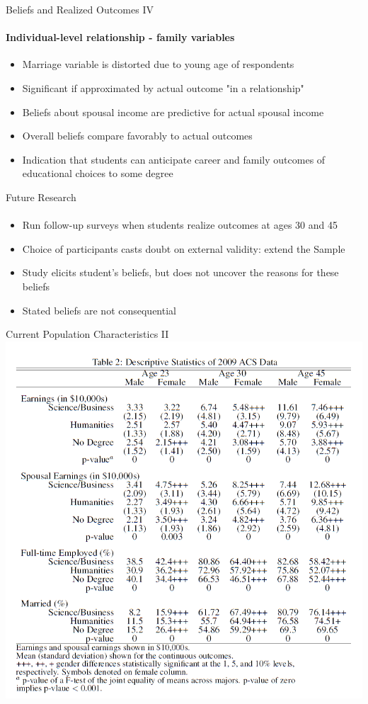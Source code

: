 \documentclass[12pt]{beamer}
\begin{document}
\begin{frame}{Beliefs and Realized Outcomes IV}
    \framesubtitle{Individual-level relationship - family variables}
    \begin{itemize}
        \item Marriage variable is distorted due to young age of respondents
        \item Significant if approximated by actual outcome "in a relationship"
        \item Beliefs about spousal income are predictive for actual spousal income
        \vspace{0.5cm}
        \item Overall beliefs compare favorably to actual outcomes
        \item Indication that students can anticipate career and family outcomes of educational choices to some degree
    \end{itemize}
   
\end{frame}

\begin{frame}{Future Research}
    \framesubtitle{} 
    \begin{itemize}
        \item Run follow-up surveys when students realize outcomes at ages 30 and 45
        \item Choice of participants casts doubt on external validity: extend the Sample
        \item Study elicits student's beliefs, but does not uncover the reasons for these beliefs
        \item Stated beliefs are not consequential
    \end{itemize}
\end{frame}

\begin{frame}{Current Population Characteristics II}
    \includegraphics[scale=0.4]{Table2.png}
\end{frame}
\end{document}
